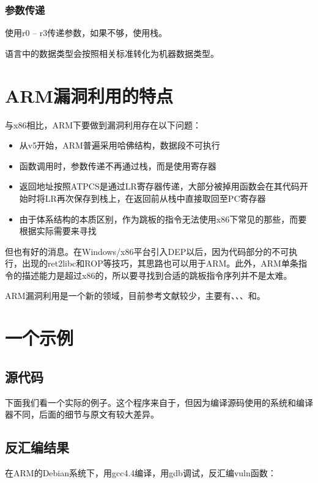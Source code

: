 \subsubsection{参数传递}

使用r0 – r3传递参数，如果不够，使用栈。

语言中的数据类型会按照相关标准转化为机器数据类型。
\section{ARM漏洞利用的特点}
与x86相比，ARM下要做到漏洞利用存在以下问题：
\begin{itemize}
\item 从v5开始，ARM普遍采用哈佛结构，数据段不可执行
\item 函数调用时，参数传递不再通过栈，而是使用寄存器
\item 返回地址按照ATPCS是通过LR寄存器传递，大部分被掉用函数会在其代码开始时将LR再次保存到栈上，在返回前从栈中直接取回至PC寄存器
\item 由于体系结构的本质区别，作为跳板的指令无法使用x86下常见的那些，而要根据实际需要来寻找
\end{itemize}
但也有好的消息。在Windows/x86平台引入DEP以后，因为代码部分的不可执行，出现的ret2libc和ROP等技巧，其思路也可以用于ARM。此外，ARM单条指令的描述能力是超过x86的，所以要寻找到合适的跳板指令序列并不是太难。

ARM漏洞利用是一个新的领域，目前参考文献较少，主要有\cite{arm_exploiting_linux}、\cite{arm_stack_exploitation}、\cite{arm_exploitation}、\cite{arm_ropmap}和\cite{arm_alphanumeric}。
\section{一个示例}
\subsection{源代码}
下面我们看一个实际的例子。这个程序来自于\cite{arm_exploiting_linux}，但因为编译源码使用的系统和编译器不同，后面的细节与原文有较大差异。


\subsection{反汇编结果}
在ARM的Debian系统下，用gcc4.4编译，用gdb调试，反汇编vuln函数：




